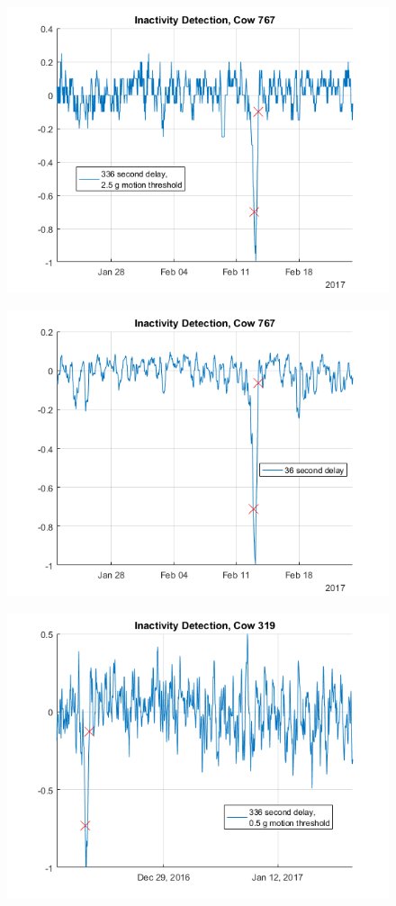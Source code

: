 \begin{figure}[h]
\centering
\includegraphics[width = 0.75 \textwidth]{figures/InactivityDetectionCow767_336period2_5threshold.png}
\caption{}
\label{}
\end{figure}

\begin{figure}[h]
\centering
\includegraphics[width = 0.75 \textwidth]{figures/InactivityDetectionCow767_36period.png}
\caption{}
\label{}
\end{figure}

\begin{figure}[h]
\centering
\includegraphics[width = 0.75 \textwidth]{figures/InactivityDetectionCow319_336period05threshold.png}
\caption{}
\label{}
\end{figure}


